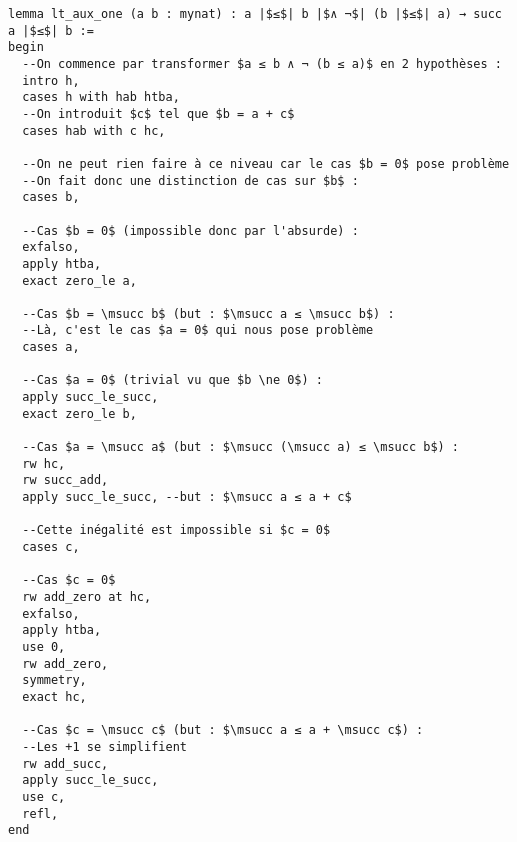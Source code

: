 \begin{verbatim}
lemma lt_aux_one (a b : mynat) : a |$≤$| b |$∧ ¬$| (b |$≤$| a) → succ a |$≤$| b :=
begin
  --On commence par transformer $a ≤ b ∧ ¬ (b ≤ a)$ en 2 hypothèses :
  intro h,
  cases h with hab htba,
  --On introduit $c$ tel que $b = a + c$
  cases hab with c hc,

  --On ne peut rien faire à ce niveau car le cas $b = 0$ pose problème
  --On fait donc une distinction de cas sur $b$ :
  cases b,

  --Cas $b = 0$ (impossible donc par l'absurde) :
  exfalso,
  apply htba,
  exact zero_le a,

  --Cas $b = \msucc b$ (but : $\msucc a ≤ \msucc b$) :
  --Là, c'est le cas $a = 0$ qui nous pose problème
  cases a,

  --Cas $a = 0$ (trivial vu que $b \ne 0$) :
  apply succ_le_succ,
  exact zero_le b,

  --Cas $a = \msucc a$ (but : $\msucc (\msucc a) ≤ \msucc b$) :
  rw hc,
  rw succ_add,
  apply succ_le_succ, --but : $\msucc a ≤ a + c$
  
  --Cette inégalité est impossible si $c = 0$
  cases c,

  --Cas $c = 0$
  rw add_zero at hc,
  exfalso,
  apply htba,
  use 0,
  rw add_zero,
  symmetry,
  exact hc,

  --Cas $c = \msucc c$ (but : $\msucc a ≤ a + \msucc c$) :
  --Les +1 se simplifient
  rw add_succ,
  apply succ_le_succ,
  use c,
  refl,
end
\end{verbatim}
